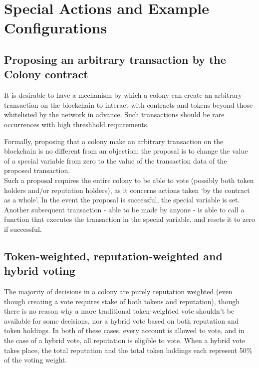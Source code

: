 \section{Special Actions and Example Configurations}\label{sec:special-cases}





%
%



\subsection{Proposing an arbitrary transaction by the Colony contract}\label{sec:arbitrary-transaction}
It is desirable to have a mechanism by which a colony can create an arbitrary transaction on the blockchain to interact with contracts and tokens beyond those whitelisted by the network in advance. Such transactions should be rare occurrences with high threshhold requirements.

Formally, proposing that a colony make an arbitrary transaction on the blockchain is no different from an objection; the proposal is to change the value of a special variable from zero to the value of the transaction data of the proposed transaction.\\
Such a proposal requires the entire colony to be able to vote (possibly both token holders and/or reputation holders), as it concerns actions taken `by the contract as a whole'. In the event the proposal is successful, the special variable is set. Another subsequent transaction - able to be made by anyone - is able to call a function that executes the transaction in the special variable, and resets it to zero if successful.

\subsection{Token-weighted, reputation-weighted and hybrid voting}
The majority of decisions in a colony are purely reputation weighted (even though creating a vote requires stake of both tokens and reputation), though there is no reason why a more traditional token-weighted vote shouldn't be available for some decisions, nor a hybrid vote based on both reputation and token holdings. In both of these cases, every account is allowed to vote, and in the case of a hybrid vote, all reputation is eligible to vote. When a hybrid vote takes place, the total reputation and the total token holdings each represent 50\% of the voting weight.

